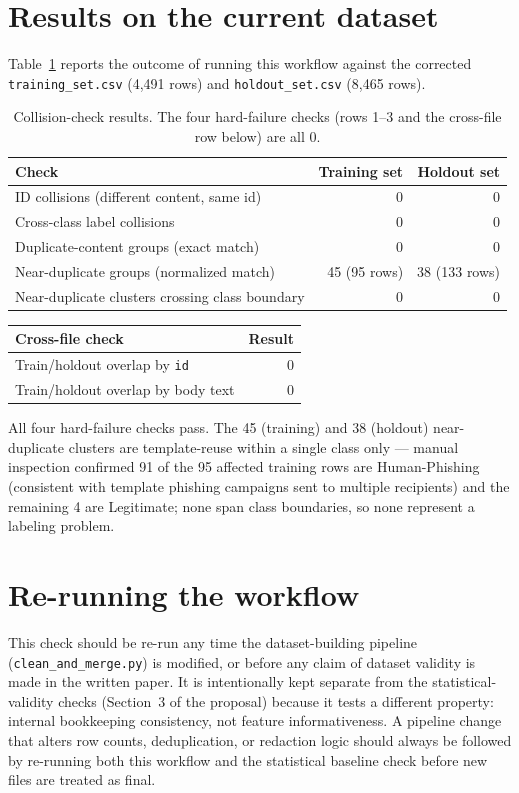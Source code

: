 \documentclass[11pt]{article}
\begin{document}
\section{Results on the current dataset}
Table~\ref{tab:results} reports the outcome of running this workflow against the corrected
\texttt{training\_set.csv} (4{,}491 rows) and \texttt{holdout\_set.csv} (8{,}465 rows).

\renewcommand{\arraystretch}{1.3}
\begin{table}[h]
\centering
\begin{tabular}{@{}p{7.2cm}rr@{}}
\toprule
\textbf{Check} & \textbf{Training set} & \textbf{Holdout set} \\
\midrule
ID collisions (different content, same id) & 0 & 0 \\
Cross-class label collisions & 0 & 0 \\
Duplicate-content groups (exact match) & 0 & 0 \\
Near-duplicate groups (normalized match) & 45 (95 rows) & 38 (133 rows) \\
Near-duplicate clusters crossing class boundary & 0 & 0 \\
\bottomrule
\end{tabular}
\caption{Collision-check results. The four hard-failure checks (rows 1--3 and the cross-file row below)
are all 0.}
\label{tab:results}
\end{table}

\vspace{-6pt}
\begin{table}[h]
\centering
\begin{tabular}{@{}p{7.2cm}r@{}}
\toprule
\textbf{Cross-file check} & \textbf{Result} \\
\midrule
Train/holdout overlap by \texttt{id} & 0 \\
Train/holdout overlap by body text & 0 \\
\bottomrule
\end{tabular}
\end{table}

All four hard-failure checks pass. The 45 (training) and 38 (holdout) near-duplicate clusters are
template-reuse within a single class only --- manual inspection confirmed 91 of the 95 affected training
rows are Human-Phishing (consistent with template phishing campaigns sent to multiple recipients) and the
remaining 4 are Legitimate; none span class boundaries, so none represent a labeling problem.

\section{Re-running the workflow}
This check should be re-run any time the dataset-building pipeline (\texttt{clean\_and\_merge.py}) is
modified, or before any claim of dataset validity is made in the written paper. It is intentionally kept
separate from the statistical-validity checks (Section~3 of the proposal) because it tests a different
property: internal bookkeeping consistency, not feature informativeness. A pipeline change that alters
row counts, deduplication, or redaction logic should always be followed by re-running both this workflow
and the statistical baseline check before new files are treated as final.
\end{document}
